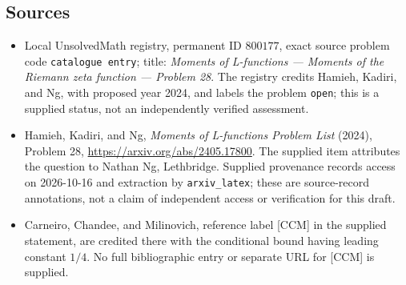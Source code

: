 \documentclass[11pt]{article}
\begin{document}
\subsection{Sources}
\begin{itemize}
\item Local UnsolvedMath registry, permanent ID \(800177\), exact source problem code \texttt{catalogue entry}; title: \emph{Moments of L-functions --- Moments of the Riemann zeta function --- Problem 28}. The registry credits Hamieh, Kadiri, and Ng, with proposed year 2024, and labels the problem \texttt{open}; this is a supplied status, not an independently verified assessment.
\item Hamieh, Kadiri, and Ng, \emph{Moments of L-functions Problem List} (2024), Problem 28, \url{https://arxiv.org/abs/2405.17800}. The supplied item attributes the question to Nathan Ng, Lethbridge. Supplied provenance records access on 2026-10-16 and extraction by \texttt{arxiv\_latex}; these are source-record annotations, not a claim of independent access or verification for this draft.
\item Carneiro, Chandee, and Milinovich, reference label [CCM] in the supplied statement, are credited there with the conditional bound having leading constant \(1/4\). No full bibliographic entry or separate URL for [CCM] is supplied.
\end{itemize}
\end{document}
